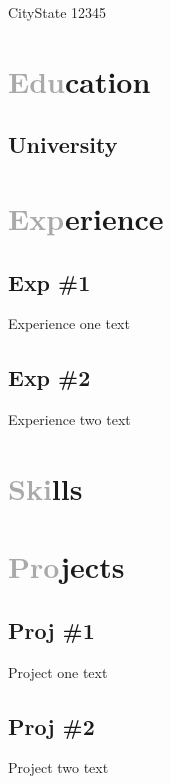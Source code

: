 \documentclass[11pt, a4paper]{coding-resume}
\begin{document}
\address{123 Street}{City}{State 12345}



\section{\textcolor{darkgray}{Edu}cation}
\subsection{University}
\section{\textcolor{darkgray}{Exp}erience}
\subsection{Exp \#1}
Experience one text
\subsection{Exp \#2}
Experience two text
\section{\textcolor{darkgray}{Ski}lls}
\section{\textcolor{darkgray}{Pro}jects}
\subsection{Proj \#1}
Project one text
\subsection{Proj \#2}
Project two text
\end{document}
